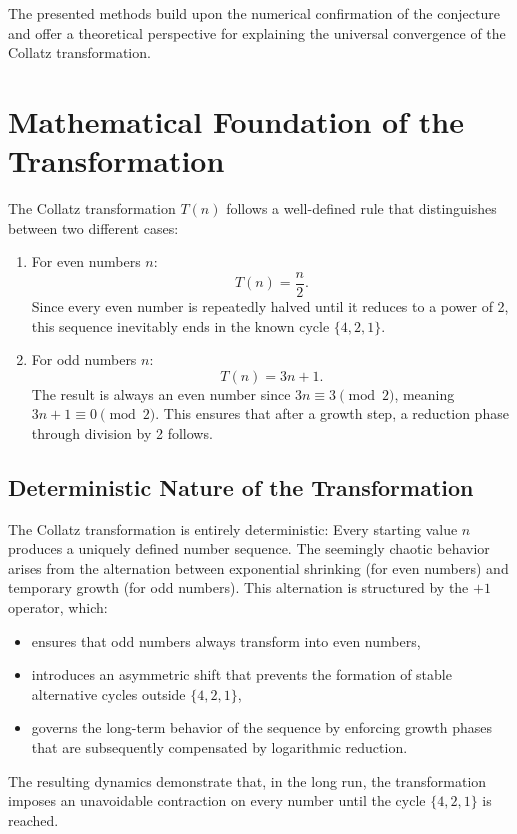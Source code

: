 \documentclass[a4paper,12pt]{article}
\begin{document}
The presented methods build upon the numerical confirmation of the conjecture and offer a theoretical perspective for explaining the universal convergence of the Collatz transformation.

\section{Mathematical Foundation of the Transformation}
The Collatz transformation \( T(n) \) follows a well-defined rule that distinguishes between two different cases:
\begin{enumerate}
    \item For even numbers \( n \):
    \[
    T(n) = \frac{n}{2}.
    \]
    Since every even number is repeatedly halved until it reduces to a power of 2, this sequence inevitably ends in the known cycle \( \{4, 2, 1\} \).
    
    \item For odd numbers \( n \):
    \[
    T(n) = 3n + 1.
    \]
    The result is always an even number since \( 3n \equiv 3 \pmod{2} \), meaning \( 3n + 1 \equiv 0 \pmod{2} \). This ensures that after a growth step, a reduction phase through division by 2 follows.
\end{enumerate}

\subsection{Deterministic Nature of the Transformation}
The Collatz transformation is entirely deterministic: Every starting value \( n \) produces a uniquely defined number sequence. The seemingly chaotic behavior arises from the alternation between exponential shrinking (for even numbers) and temporary growth (for odd numbers). This alternation is structured by the \(+1\) operator, which:

\begin{itemize}
    \item ensures that odd numbers always transform into even numbers,
    \item introduces an asymmetric shift that prevents the formation of stable alternative cycles outside \( \{4, 2, 1\} \),
    \item governs the long-term behavior of the sequence by enforcing growth phases that are subsequently compensated by logarithmic reduction.
\end{itemize}

The resulting dynamics demonstrate that, in the long run, the transformation imposes an unavoidable contraction on every number until the cycle \( \{4, 2, 1\} \) is reached.
\end{document}
